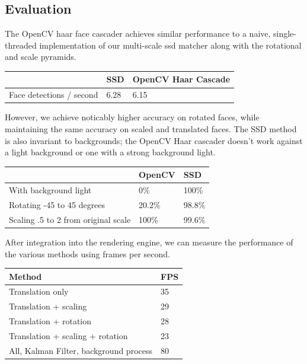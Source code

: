 \documentclass[10pt,twocolumn,letterpaper]{article}
\begin{document}
\subsection*{Evaluation}
The OpenCV haar face cascader achieves similar performance to a naive, single-threaded implementation of our multi-scale ssd matcher along with the rotational and scale pyramids.
\begin{center}
    \begin{tabular}{| l | l | l |}
    \hline
    \         & SSD & OpenCV Haar Cascade \\ \hline
    Face detections / second & 6.28 & 6.15 \\  \hline
    \end{tabular}
\end{center}

However, we achieve noticably higher accuracy on rotated faces, while maintaining the same accuracy on scaled and translated faces. The SSD method is also invariant to backgrounds; the OpenCV Haar cascader doesn't work against a light background or one with a strong background light.

\begin{center}
    \begin{tabular}{| l | l | l |}
    \hline
    \                                                 & OpenCV & SSD          \\ \hline
     With background light                  & 0\%       & 100\%       \\ \hline 
     Rotating -45 to 45 degrees           &  20.2\%  & 98.8\%      \\ \hline                 
     Scaling .5 to 2 from original scale & 100\%    & 99.6\%                 \\  \hline
\end{tabular}
\end{center}

After integration into the rendering engine, we can measure the performance of the various methods using frames per second.

\begin{center}
    \begin{tabular}{| l | l |}
    \hline
     Method                                                 & FPS       \\ \hline
     Translation only                                    & 35           \\ \hline 
     Translation + scaling                             &  29           \\ \hline      
    Translation + rotation                            & 28             \\ \hline           
    Translation + scaling + rotation              & 23             \\  \hline
    All, Kalman Filter, background process    & 80             \\   \hline
\end{tabular}
\end{center}
\end{document}

